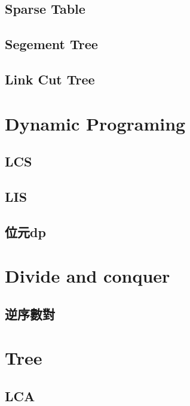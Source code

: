 \subsection{Sparse Table}

\subsection{Segement Tree}

\subsection{Link Cut Tree}


\section{Dynamic Programing}
\subsection{LCS}

\subsection{LIS}

\subsection{位元dp}


\section{Divide and conquer}
\subsection{逆序數對}


\section{Tree}
\subsection{LCA}
